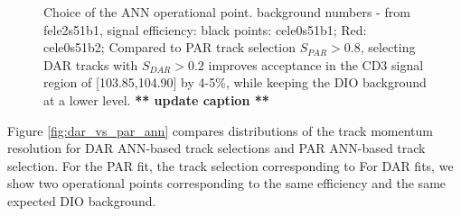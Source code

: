 \begin{figure}
\caption{
  \label{fig:ann_operational_point_choice}
  Choice of the ANN operational point. background numbers - from fele2s51b1,
  signal efficiency: black points: cele0s51b1; Red: cele0s51b2;
  Compared to PAR track selection $S_{PAR} > 0.8$, selecting DAR tracks with $S_{DAR} > 0.2$ 
  improves acceptance in the CD3 signal region of [103.85,104.90] by 4-5\%, 
  while keeping the DIO background at a lower level.
  {\color{red} {\bf *** update caption **}}
}
\end{figure}

Figure \ref{fig:dar_vs_par_ann} compares distributions of the track momentum resolution for DAR ANN-based track
selections and PAR ANN-based track selection. For the PAR fit, the track selection corresponding to For DAR fits, 
we show two operational points corresponding to the same efficiency and the same expected DIO background.

